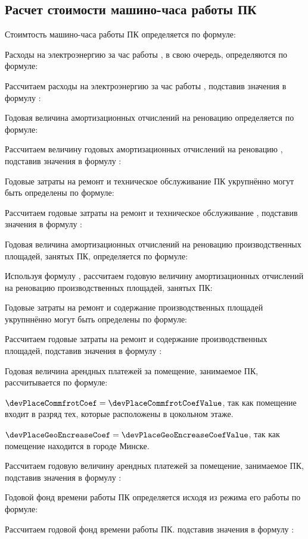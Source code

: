 \subsection{Расчет стоимости машино-часа работы ПК}
\label{sec:economics:cpuclocktime}

Стоимтость машино-часа работы ПК определяется по формуле:
\pcHourCostEquation

Расходы на электроэнергию за час работы \pc, в свою очередь, определяются по формуле:
\energyHourCostEquation

Рассчитаем расходы на электроэнергию за час работы \pc, подставив значения в формулу :
\energyHourCostFormulaApplied

Годовая величина амортизационных отчислений на реновацию \pc определяется по формуле:
\pcAmortizationCostEquation

Рассчитаем величину годовых амортизационных отчислений на реновацию \pc, подставив значения в формулу :
\pcAmortizationCostFormulaApplied

Годовые затраты на ремонт и техническое обслуживание ПК укрупнённо могут быть определены по формуле:
\pcSupportCostEquation

Рассчитаем годовые затраты на ремонт и техническое обслуживание \pc, подставив значения в формулу :
\pcSupportCostFormulaApplied

Годовая величина амортизационных отчислений на реновацию производственных площадей, занятых ПК, определяется по формуле:
\devPlaceAmortizationCostEquation

Используя формулу , рассчитаем годовую величину амортизационных отчислений на реновацию производственных площадей, занятых ПК:
\devPlaceAmortizationCostFormulaApplied

Годовые затраты на ремонт и содержание производственных площадей укрупннённо могут быть определены по формуле:
\devPlaceSupportCostEquation

Рассчитаем годовые затраты на ремонт и содержание производственных площадей, подставив значения в формулу :
\devPlaceSupportCostFormulaApplied

Годовая величина арендных платежей за помещение, занимаемое ПК, рассчитывается по формуле:
\devPlaceRentCostEquation

\(\devPlaceCommfrotCoef = \devPlaceCommfrotCoefValue\), так как помещение входит в разряд тех, которые расположены в цокольном этаже.

\(\devPlaceGeoEncreaseCoef = \devPlaceGeoEncreaseCoefValue\), так как помещение находится в городе Минске.

Рассчитаем годовую величину арендных платежей за помещение, занимаемое ПК, подставив значения в формулу :
\devPlaceRentCostFormulaApplied

Годовой фонд времени работы ПК определяется исходя из режима его работы по формуле:
\pcWorkabilityFundEquation

Рассчитаем годовой фонд времени работы ПК. подставив значения в формулу :
\pcWorkabilityFundFormulaApplied